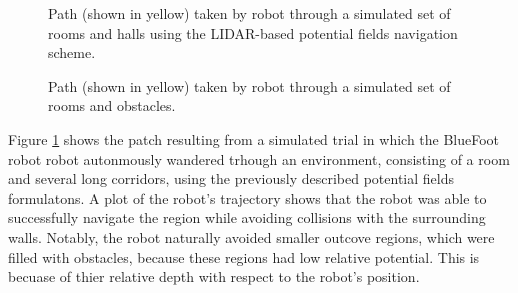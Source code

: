				\begin{figure}[h!]
					\centering
					\caption{Path (shown in yellow) taken by robot through a simulated set of rooms and halls using the LIDAR-based potential fields navigation scheme.}
					\label{fig::potential_field_results}
				\end{figure}
				\begin{figure}[h!]
					\centering
					\caption{Path (shown in yellow) taken by robot through a simulated set of rooms and obstacles.}
					\label{fig::potential_field_results_obstacles}
				\end{figure}
		
			Figure \ref{fig::potential_field_results} shows the patch resulting from a simulated trial in which the BlueFoot robot robot autonmously wandered trhough an environment, consisting of a room and several long corridors, using the previously described potential fields formulatons. A plot of the robot's trajectory shows that the robot was able to successfully navigate the region while avoiding collisions with the surrounding walls. Notably, the robot naturally avoided smaller outcove regions, which were filled with obstacles, because these regions had low relative potential. This is becuase of thier relative depth with respect to the robot's position. 

